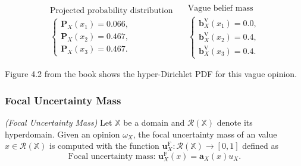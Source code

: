 \def\arraystretch{1}
\begin{equation}
    \begin{array}{l}
        \text{Projected probability distribution} \\
        \left\{\begin{array}{l}
            \mathbf{P}_X(x_1) = 0.066 \text{,} \\
            \mathbf{P}_X(x_2) = 0.467 \text{,} \\
            \mathbf{P}_X(x_3) = 0.467 \text{.}
        \end{array}\right.
    \end{array} \quad
    \begin{array}{l}
        \text{Vague belief mass} \\
        \left\{\begin{array}{l}
            \mathbf{b}^{\mathrm{V}}_X(x_1) = 0.0 \text{,} \\
            \mathbf{b}^{\mathrm{V}}_X(x_2) = 0.4 \text{,} \\
            \mathbf{b}^{\mathrm{V}}_X(x_3) = 0.4 \text{.}
        \end{array}\right.
    \end{array}
\end{equation}

Figure 4.2 from the book shows the hyper-Dirichlet PDF for this vague opinion.

\subsubsection{Focal Uncertainty Mass}

\begin{definition}
    \emph{(Focal Uncertainty Mass)} Let $\mathbb{X}$ be a domain and $\mathcal{R}(\mathbb{X})$ denote its
hyperdomain. Given an opinion $\omega_X$, the focal uncertainty mass of an value $x \in \mathcal{R}(\mathbb{X})$
is computed with the function $\mathbf{u}^{\mathrm{F}}_X : \mathcal{R}(\mathbb{X}) \rightarrow [0, 1]$ defined as
    \begin{equation}
        \text{Focal uncertainty mass: } \mathbf{u}^{\mathrm{F}}_X(x) = \mathbf{a}_X(x) u_X \text{.}
    \end{equation}
\end{definition}
